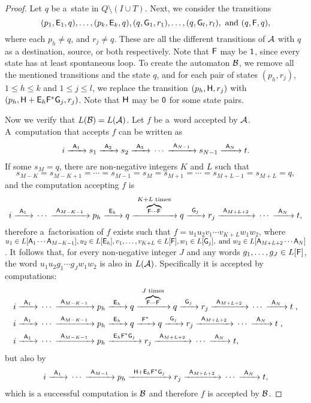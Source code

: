 \begin{proof}
    Let $q$ be a~state in $Q \setminus (I \cup T)$. Next, we consider the transitions
    \[
        (p_1, \re{E}_1, q), \dotsc, (p_k, \re{E}_k, q), (q, \re{G}_1, r_1), \dotsc, (q, \re{G}_l, r_l), \text{ and } (q, \re{F}, q),
    \]
    where each $p_h \neq q$, and $r_j \neq q$. These are all the different transitions of $\aut{A}$ with $q$ as a destination, source, or both respectively. Note that $\re{F}$ may be $\re{1}$, since every state has at least spontaneous loop. To create the automaton $\aut{B}$, we remove all the mentioned transitions and the state $q$, and for each pair of states $(p_h, r_j)$, $1 \leq h \leq k$ and $1 \leq j \leq l$, we replace the transition $(p_h, \re{H}, r_j)$ with $(p_h, \re{H} + \re{E}_h\re{F}^*\re{G}_j, r_j)$. Note that $\re{H}$ may be $\re{0}$ for some state pairs.

    Now we verify that $L(\aut{B}) = L(\aut{A})$. Let $f$ be a~word accepted by $\aut{A}$. A~computation that accepts $f$ can be written as
    \[
        i \tr{\re{A}_1} s_1 \tr{\re{A}_2} s_2 \tr{\re{A}_3} \dotsm \tr{\re{A}_{N-1}} s_{N-1} \tr{\re{A}_N} t.
    \]
    If some $s_M = q$, there are non-negative integers $K$ and $L$ such that
    \[
        s_{M-K} = s_{M-K+1} = \dotsb = s_{M-1} = s_M = s_{M+1} = \dotsb = s_{M+L-1} = s_{M+L} = q,
    \]
    and the computation accepting $f$ is
    \[
        i \tr{\re{A}_1} \dotsm \tr{\re{A}_{M-K-1}} p_h \tr{\re{E}_h} q \tr{\overbrace{\scriptstyle \re{F} \dotsm \re{F}}^{\scriptstyle K+L \text{ times}}} q \tr{\re{G}_j} r_j \tr{\re{A}_{M+L+2}} \dotsm \tr{\re{A}_N} t,
    \]
    therefore a~factorisation of $f$ exists such that $f = u_1 u_2 v_1 \dotsm v_{K + L} w_1 w_2$, where $u_1 \in L[\re{A}_1 \dotsm \re{A}_{M-K-1}], u_2 \in L[\re{E}_h], v_1, \dotsc, v_{K+L} \in L[\re{F}], w_1 \in L[\re{G}_j], \text{ and } w_2 \in L[\re{A}_{M+L+2} \dotsm \re{A}_N]$. It follows that, for every non-negative integer $J$ and any words $g_1, \dotsc, g_J \in L[\re{F}]$, the word $u_1 u_2 g_1 \dotsm g_J w_1 w_2$ is also in $L(\aut{A})$. Specifically it is accepted by computations:
    \begin{align*}
        i \tr{\re{A}_1} \dotsm \tr{\re{A}_{M-K-1}} &p_h \tr{\re{E}_h} q \tr{\overbrace{\scriptstyle \re{F} \dotsm \re{F}}^{\scriptstyle J \text{ times}}} q \tr{\re{G}_j} r_j \tr{\re{A}_{M+L+2}} \dotsm \tr{\re{A}_N} t \; , \\
        i \tr{\re{A}_1} \dotsm \tr{\re{A}_{M-K-1}} &p_h \tr{\re{E}_h} q \tr{\re{F}^*} q \tr{\re{G}_j} r_j \tr{\re{A}_{M+L+2}} \dotsm \tr{\re{A}_N} t \; , \\
        i \tr{\re{A}_1} \dotsm \tr{\re{A}_{M-K-1}} &p_h \tr{\re{E}_h\re{F}^*\re{G}_j} r_j \tr{\re{A}_{M+L+2}} \dotsm \tr{\re{A}_N} t,
    \end{align*}
    but also by
    \[
        i \tr{\re{A}_1} \dotsm \tr{\re{A}_{M-1}} p_h \tr{\re{H} + \re{E}_h\re{F}^*\re{G}_j} r_j \tr{\re{A}_{M+L+2}} \dotsm \tr{\re{A}_N} t,
    \]
    which is a successful computation is $\aut{B}$ and therefore $f$ is accepted by $\aut{B}$.


\end{proof}
